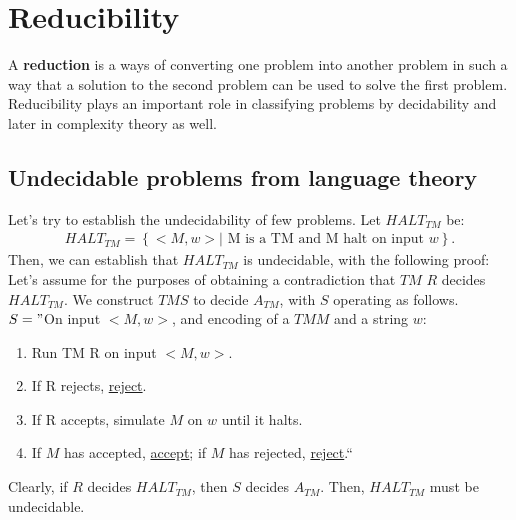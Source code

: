 \documentclass[a4paper]{article}
\begin{document}
\section{Reducibility} %
\label{sec:Reductibility}
A {\bf reduction} is a ways of converting one problem into another problem in such a way that a solution to the second problem can be used to solve the first problem. Reducibility plays an important role in classifying problems by decidability and later in complexity theory as well. 
\subsection{Undecidable problems from language theory} %
\label{sub:Undecidable problems from language theory}
Let's try to establish the undecidability of few problems. Let $HALT_{TM}$ be:
\begin{align}
  HALT_{TM} = \left\{ <M,w>| \text{ M is a TM and M halt on input }w \right\}.
\end{align}
Then, we can establish that $HALT_{TM}$ is undecidable, with the following proof:
Let's assume for the purposes of obtaining a contradiction that $TM$ $R$ decides $HALT_{TM}$. We construct $TM S$ to decide $A_{TM}$, with $S$ operating as follows. \\
$S="$On input $<M,w>$, and encoding of a $TM M$ and a string $w$:
\begin{enumerate}[{\bf 1.}]
  \item Run TM R on input $<M,w>$.
  \item If R rejects, \underline{reject}.
  \item If R accepts, simulate $M$ on $w$ until it halts.
  \item If $M$ has accepted, \underline{accept}; if $M$ has rejected, \underline{reject}.``
\end{enumerate}
Clearly, if $R$ decides $HALT_{TM}$, then $S$ decides $A_{TM}$. Then, $HALT_{TM}$ must be undecidable. \\
\end{document}
